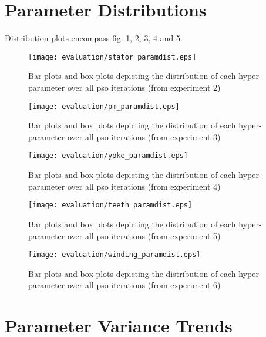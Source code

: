 \section{Parameter Distributions}
\label{app:param_dist}
Distribution plots encompass fig. \ref{fig:stator_param_dist}, \ref{fig:pm_param_dist}, \ref{fig:yoke_param_dist}, \ref{fig:teeth_param_dist} and \ref{fig:winding_param_dist}.
\begin{figure}[!hbt]
	\centering
	\texttt{[image: evaluation/stator\_paramdist.eps]}
	\caption{Bar plots and box plots depicting the distribution of each hyper-parameter over all \gls{pso} iterations (from experiment 2)}
	\label{fig:stator_param_dist}
\end{figure}
\begin{figure}[!hbt]
	\centering
	\texttt{[image: evaluation/pm\_paramdist.eps]}
	\caption{Bar plots and box plots depicting the distribution of each hyper-parameter over all \gls{pso} iterations (from experiment 3)}
	\label{fig:pm_param_dist}
\end{figure}
\begin{figure}[!hbt]
	\centering
	\texttt{[image: evaluation/yoke\_paramdist.eps]}
	\caption{Bar plots and box plots depicting the distribution of each hyper-parameter over all \gls{pso} iterations (from experiment 4)}
	\label{fig:yoke_param_dist}
\end{figure}
\begin{figure}[!hbt]
	\centering
	\texttt{[image: evaluation/teeth\_paramdist.eps]}
	\caption{Bar plots and box plots depicting the distribution of each hyper-parameter over all \gls{pso} iterations (from experiment 5)}
	\label{fig:teeth_param_dist}
\end{figure}
\begin{figure}[!hbt]
	\centering
	\texttt{[image: evaluation/winding\_paramdist.eps]}
	\caption{Bar plots and box plots depicting the distribution of each hyper-parameter over all \gls{pso} iterations (from experiment 6)}
	\label{fig:winding_param_dist}
\end{figure}\clearpage

\section{Parameter Variance Trends}
\label{app:param_var}

